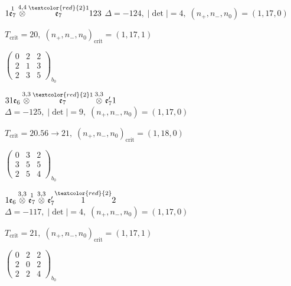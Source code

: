 \documentclass[10pt]{article}
\begin{document}
\smallskip

$1\overset{1}{\mathfrak{e}_7}\overset{4,4}{\otimes}\overset{\textcolor{red}{2}1}{\mathfrak{e}_7}123$ \quad $\Delta=-124,\; |\det|=4,\; (n_+,n_-,n_0)=(1,17,0)$

\hspace{1em}$T_{\text{crit}}=20,\; (n_+,n_-,n_0)_{\text{crit}}=(1,17,1)$

\hspace{2em}$\left(\begin{smallmatrix}0 & 2 & 2 \\ 2 & 1 & 3 \\ 2 & 3 & 5\end{smallmatrix}\right)_{\!b_0}$

\smallskip

$31\mathfrak{e}_6\overset{3,3}{\otimes}\overset{\textcolor{red}{2}1}{\mathfrak{e}_7}\overset{3,3}{\otimes}\mathfrak{e}_7'1$ \quad $\Delta=-125,\; |\det|=9,\; (n_+,n_-,n_0)=(1,17,0)$

\hspace{1em}$T_{\text{crit}}=20.56 \to 21,\; (n_+,n_-,n_0)_{\text{crit}}=(1,18,0)$

\hspace{2em}$\left(\begin{smallmatrix}0 & 3 & 2 \\ 3 & 5 & 5 \\ 2 & 5 & 4\end{smallmatrix}\right)_{\!b_0}$

\smallskip

$1\mathfrak{e}_6\overset{3,3}{\otimes}\overset{1}{\mathfrak{e}_7}\overset{3,3}{\otimes}\mathfrak{e}_7'\overset{\textcolor{red}{2}}{1}2$ \quad $\Delta=-117,\; |\det|=4,\; (n_+,n_-,n_0)=(1,17,0)$

\hspace{1em}$T_{\text{crit}}=21,\; (n_+,n_-,n_0)_{\text{crit}}=(1,17,1)$

\hspace{2em}$\left(\begin{smallmatrix}0 & 2 & 2 \\ 2 & 0 & 2 \\ 2 & 2 & 4\end{smallmatrix}\right)_{\!b_0}$
\end{document}
